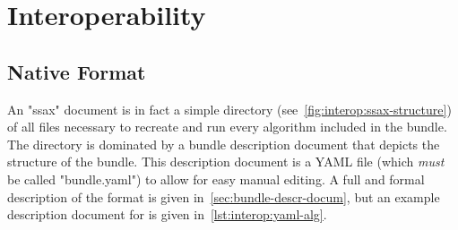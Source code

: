 \section{Interoperability}
\label{sec:iface-interoperability}
\subsection{Native Format}
\label{sec:interop:native}
An "ssax" document is in fact a simple directory
  (see~\autoref{fig:interop:ssax-structure})
  of all files necessary to recreate and run
  every algorithm included in the bundle.
The directory is dominated by a bundle description document
  that depicts the structure of the bundle.
This description document is a YAML file
  (which \emph{must} be called "bundle.yaml")
  to allow for easy manual editing.
A full and formal description of the format is given in~\autoref{sec:bundle-descr-docum},
  but an example description document for  is given in~\autoref{lst:interop:yaml-alg}.

